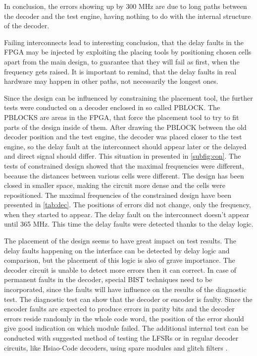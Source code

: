 In conclusion, the errors showing up by 300 MHz are due to long paths between the decoder and the test engine, having nothing to do with the internal structure of the decoder.

Failing interconnects lead to interesting conclusion, that the delay faults in the FPGA may be injected by exploiting the placing tools by positioning chosen cells apart from the main design, to guarantee that they will fail as first, when the frequency gets raised. It is important to remind, that the delay faults in real hardware may happen in other paths, not necessarily the longest ones.

Since the design can be influenced by constraining the placement tool, the further tests were conducted on a decoder enclosed in so called PBLOCK. The PBLOCKS are areas in the FPGA, that force the placement tool to try to fit parts of the design inside of them. After drawing the PBLOCK between the old decoder position and the test engine, the decoder was placed closer to the test engine, so the delay fault at the interconnect should appear later or the delayed and direct signal should differ. This situation in presented in \autoref{subfig:con}. The tests of constrained design showed that the maximal frequencies were different, because the distances between various cells were different. The design has been closed in smaller space, making the circuit more dense and the cells were repositioned. The maximal frequencies of the constrained design have been presented in \autoref{tab:dec}. The positions of errors did not change, only the frequency, when they started to appear. The delay fault on the interconnect doesn't appear until 365 MHz. This time the delay faults were detected thanks to the delay logic.

The placement of the design seems to have great impact on test results. The delay faults happening on the interface can be detected by delay logic and comparison, but the placement of this logic is also of grave importance. The decoder circuit is unable to detect more errors then it can correct. In case of permanent faults in the decoder, special BIST techniques need to be incorporated, since the faults will have influence on the results of the diagnostic test. The diagnostic test can show that the decoder or encoder is faulty. Since the encoder faults are expected to produce errors in parity bits and the decoder errors reside randomly in the whole code word, the position of the error should give good indication on which module failed. The additional internal test can be conducted with suggested method of testing the LFSRs \cite{art:Gleichner} or in regular decoder circuits, like Hsiao-Code decoders, using spare modules and glitch filters \cite{art:Dicorato}.


